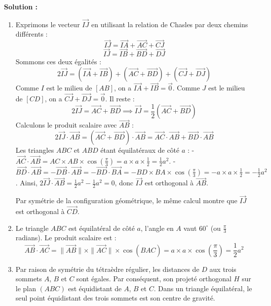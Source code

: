 \textbf{Solution :}
\begin{enumerate}
    \item Exprimons le vecteur $\vec{IJ}$ en utilisant la relation de Chasles par deux chemins différents :
    \[
    \vec{IJ} = \vec{IA} + \vec{AC} + \vec{CJ}
    \]
    \[
    \vec{IJ} = \vec{IB} + \vec{BD} + \vec{DJ}
    \]
    Sommons ces deux égalités :
    \[
    2\vec{IJ} = (\vec{IA} + \vec{IB}) + (\vec{AC} + \vec{BD}) + (\vec{CJ} + \vec{DJ})
    \]
    Comme $I$ est le milieu de $[AB]$, on a $\vec{IA} + \vec{IB} = \vec{0}$.
    Comme $J$ est le milieu de $[CD]$, on a $\vec{CJ} + \vec{DJ} = \vec{0}$.
    Il reste :
    \[
    2\vec{IJ} = \vec{AC} + \vec{BD} \implies \vec{IJ} = \frac{1}{2}(\vec{AC} + \vec{BD})
    \]
    Calculons le produit scalaire avec $\vec{AB}$ :
    \[
    2\vec{IJ} \cdot \vec{AB} = (\vec{AC} + \vec{BD}) \cdot \vec{AB} = \vec{AC} \cdot \vec{AB} + \vec{BD} \cdot \vec{AB}
    \]
    Les triangles $ABC$ et $ABD$ étant équilatéraux de côté $a$ :
    - $\vec{AC} \cdot \vec{AB} = AC \times AB \times \cos(\frac{\pi}{3}) = a \times a \times \frac{1}{2} = \frac{1}{2}a^2$.
    - $\vec{BD} \cdot \vec{AB} = -\vec{DB} \cdot \vec{AB} = -\vec{BD} \cdot \vec{BA} = -BD \times BA \times \cos(\frac{\pi}{3}) = -a \times a \times \frac{1}{2} = -\frac{1}{2}a^2$.
    Ainsi, $2\vec{IJ} \cdot \vec{AB} = \frac{1}{2}a^2 - \frac{1}{2}a^2 = 0$, donc $\vec{IJ}$ est orthogonal à $\vec{AB}$.
    
    Par symétrie de la configuration géométrique, le même calcul montre que $\vec{IJ}$ est orthogonal à $\vec{CD}$.
    
    \item Le triangle $ABC$ est équilatéral de côté $a$, l'angle en $A$ vaut $60^\circ$ (ou $\frac{\pi}{3}$ radians). Le produit scalaire est :
    \[
    \vec{AB} \cdot \vec{AC} = \|\vec{AB}\| \times \|\vec{AC}\| \times \cos(\widehat{BAC}) = a \times a \times \cos\left(\frac{\pi}{3}\right) = \frac{1}{2}a^2
    \]
    
    \item Par raison de symétrie du tétraèdre régulier, les distances de $D$ aux trois sommets $A$, $B$ et $C$ sont égales. Par conséquent, son projeté orthogonal $H$ sur le plan $(ABC)$ est équidistant de $A$, $B$ et $C$. Dans un triangle équilatéral, le seul point équidistant des trois sommets est son centre de gravité.
    

\end{enumerate}

